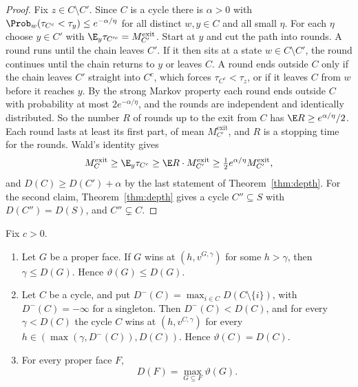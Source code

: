 \begin{proof}
Fix $z\in C\setminus C'$. Since $C$ is a cycle there is $\alpha>0$ with
$\Prob_w(\tau_{C^c}<\tau_y)\le e^{-\alpha/\eta}$ for all distinct $w,y\in C$ and
all small $\eta$. For each $\eta$ choose $y\in C'$ with
$\E_y\tau_{C'^c}=M^{\mathrm{exit}}_{C'}$. Start at $y$ and cut the path into
rounds. A round runs until the chain leaves $C'$. If it then sits at a state
$w\in C\setminus C'$, the round continues until the chain returns to $y$ or
leaves $C$. A round ends outside $C$ only if the chain leaves $C'$ straight into
$C^c$, which forces $\tau_{C^c}<\tau_z$, or if it leaves $C$ from $w$ before it
reaches $y$. By the strong Markov property each round ends outside $C$ with
probability at most $2e^{-\alpha/\eta}$, and the rounds are independent and
identically distributed. So the number $R$ of rounds up to the exit from $C$ has
$\E R\ge e^{\alpha/\eta}/2$. Each round lasts at least its first part, of mean
$M^{\mathrm{exit}}_{C'}$, and $R$ is a stopping time for the rounds. Wald's
identity gives
\[
 M^{\mathrm{exit}}_C\ge\E_y\tau_{C^c}\ge\E R\cdot M^{\mathrm{exit}}_{C'}
 \ge\tfrac12e^{\alpha/\eta}M^{\mathrm{exit}}_{C'} ,
\]
and $D(C)\ge D(C')+\alpha$ by the last statement of Theorem~\ref{thm:depth}.
For the second claim, Theorem~\ref{thm:depth} gives a cycle $C''\subseteq S$
with $D(C'')=D(S)$, and $C''\subsetneq C$.
\end{proof}

\begin{theorem}\label{thm:attraction}
Fix $c>0$.
\begin{enumerate}
\item[(a)] Let $G$ be a proper face. If $G$ wins at $(h,v^{G,\gamma})$ for some
$h>\gamma$, then $\gamma\le D(G)$. Hence $\vartheta(G)\le D(G)$.
\item[(b)] Let $C$ be a cycle, and put $D^-(C)=\max_{i\in C}D(C\setminus\{i\})$,
with $D^-(C)=-\infty$ for a singleton. Then $D^-(C)<D(C)$, and for every
$\gamma<D(C)$ the cycle $C$ wins at $(h,v^{C,\gamma})$ for every
$h\in(\max(\gamma,D^-(C)),D(C))$. Hence $\vartheta(C)=D(C)$.
\item[(c)] For every proper face $F$,
\[
 D(F)=\max_{G\subseteq F}\vartheta(G).
\]
\end{enumerate}
\end{theorem}

